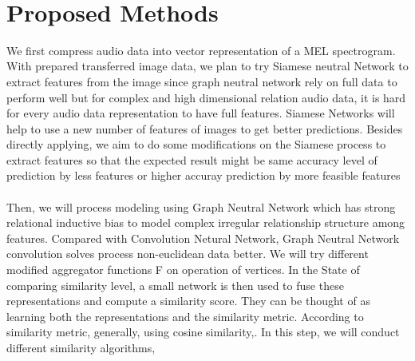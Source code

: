 \documentclass{article}
\begin{document}
\\

\section{Proposed Methods}
We first compress audio data into vector representation of a MEL spectrogram. With prepared transferred image data, we plan to try Siamese neutral Network to extract features from the image since graph neutral network rely on full data to perform well but for complex and high dimensional relation audio data, it is hard for every audio data representation to have full features. Siamese Networks will help to use a new number of features of images to get better predictions. Besides directly applying, we aim to do some modifications on the Siamese process to extract features so that the expected result might be same accuracy level of prediction by less features or higher accuray prediction by more feasible features\\
\\
Then, we will process modeling using Graph Neutral Network which has strong relational inductive bias to model complex irregular relationship structure among features.  Compared with Convolution Netural Network, Graph Neutral Network convolution solves process non-euclidean data better. We will try different modified aggregator functions F on operation of vertices. In the State of comparing similarity level, a small network is then used to fuse these representations and compute a similarity score. They can be thought of as learning both the representations and the similarity metric. According to similarity metric, generally, using cosine similarity,. In this step, we will conduct different similarity algorithms, 
\end{document}
